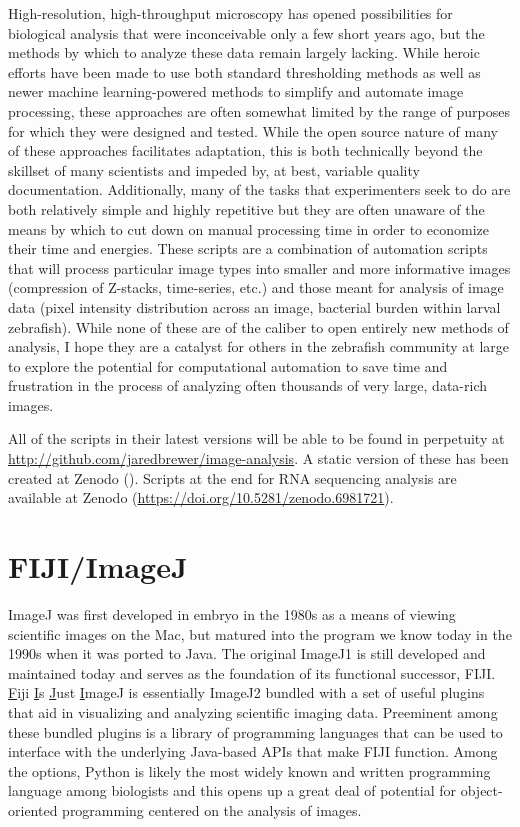 High-resolution, high-throughput microscopy has opened possibilities for biological analysis that were inconceivable only a few short years ago, but the methods by which to analyze these data remain largely lacking. While heroic efforts have been made to use both standard thresholding methods as well as newer machine learning-powered methods to simplify and automate image processing, these approaches are often somewhat limited by the range of purposes for which they were designed and tested. While the open source nature of many of these approaches facilitates adaptation, this is both technically beyond the skillset of many scientists and impeded by, at best, variable quality documentation. Additionally, many of the tasks that experimenters seek to do are both relatively simple and highly repetitive but they are often unaware of the means by which to cut down on manual processing time in order to economize their time and energies. These scripts are a combination of automation scripts that will process particular image types into smaller and more informative images (compression of Z-stacks, time-series, etc.) and those meant for analysis of image data (pixel intensity distribution across an image, bacterial burden within larval zebrafish). While none of these are of the caliber to open entirely new methods of analysis, I hope they are a catalyst for others in the zebrafish community at large to explore the potential for computational automation to save time and frustration in the process of analyzing often thousands of very large, data-rich images.

All of the scripts in their latest versions will be able to be found in perpetuity at \url{http://github.com/jaredbrewer/image-analysis}. A static version of these has been created at Zenodo (\url{}). Scripts at the end for RNA sequencing analysis are available at Zenodo (\url{https://doi.org/10.5281/zenodo.6981721}). 

\section{FIJI/ImageJ}\label{fiji}

ImageJ was first developed in embryo in the 1980s as a means of viewing scientific images on the Mac, but matured into the program we know today in the 1990s when it was ported to Java. The original ImageJ1 is still developed and maintained today and serves as the foundation of its functional successor, FIJI. \underline{F}iji \underline{I}s \underline{J}ust \underline{I}mageJ is essentially ImageJ2 bundled with a set of useful plugins that aid in visualizing and analyzing scientific imaging data. Preeminent among these bundled plugins is a library of programming languages that can be used to interface with the underlying Java-based APIs that make FIJI function. Among the options, Python is likely the most widely known and written programming language among biologists and this opens up a great deal of potential for object-oriented programming centered on the analysis of images. 

